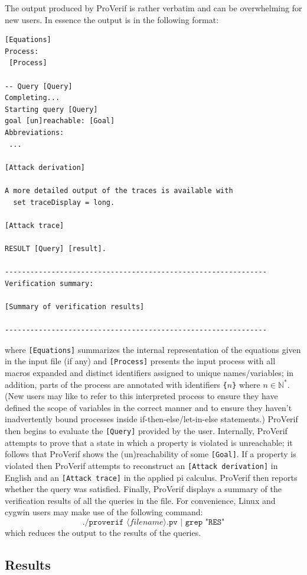 \documentclass{book}
\newcommand{\nonterm}[1]{\langle\mathit{#1}\rangle}
\newcommand{\filenamevar}{\nonterm{filename}}
\begin{document}
The output produced by ProVerif is rather verbatim and can be overwhelming for new users. In essence the output is in the following format:
%
\begin{lstlisting}[numbers=none]
[Equations]
Process:
 [Process]

-- Query [Query]
Completing...
Starting query [Query]
goal [un]reachable: [Goal]
Abbreviations:
 ...

[Attack derivation]

A more detailed output of the traces is available with
  set traceDisplay = long.

[Attack trace]

RESULT [Query] [result].

--------------------------------------------------------------
Verification summary:

[Summary of verification results]

--------------------------------------------------------------
\end{lstlisting}
%
where \lstinline{[Equations]} summarizes the internal representation of the equations given in the input file (if any) and \lstinline{[Process]} presents the input process with all macros expanded and distinct identifiers assigned to unique names/variables; in addition, parts of the process are annotated with identifiers {\tt \{$n$\}} where $n\in\mathbb{N}^*$. (New users may like to refer to this interpreted process to ensure they have defined the scope of variables in the correct manner and to ensure they haven't inadvertently bound processes inside if-then-else/let-in-else statements.) ProVerif then begins to evaluate the \lstinline{[Query]} provided by the user. Internally, ProVerif attempts to prove that a state in which a property is violated is unreachable; it follows that ProVerif shows the (un)reachability of some \lstinline{[Goal]}. If a property is violated then ProVerif attempts to reconstruct an \lstinline{[Attack derivation]} in English and an \lstinline{[Attack trace]} in the applied pi calculus. ProVerif then reports whether the query was satisfied. Finally, ProVerif displays a summary of the verification results of all the queries in the file. For convenience, Linux and cygwin users may make use of the following command:
\[
	\texttt{./proverif $\filenamevar$.pv | grep "RES"}
\]
which reduces the output to the results of the queries. %

\subsection{Results}
\end{document}

